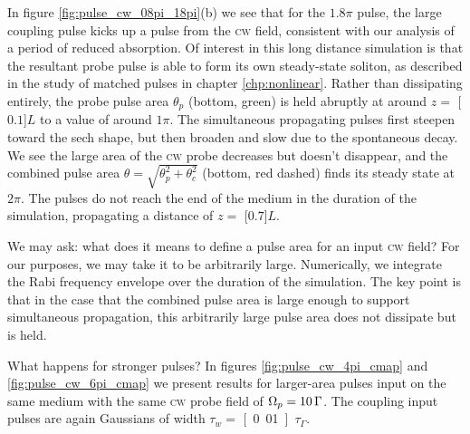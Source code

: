     In figure \ref{fig:pulse_cw_08pi_18pi}(b) we see that for the $1.8 \pi$
    pulse, the large coupling pulse kicks up a pulse from the \textsc{cw} field,
    consistent with our analysis of a period of reduced absorption. Of interest
    in this long distance simulation is that the resultant probe pulse is able
    to form its own steady-state soliton, as described in the study of matched
    pulses in chapter \ref{chp:nonlinear}. Rather than dissipating entirely, the
    probe pulse area $\theta_p$ (bottom, green) is held abruptly at around $z =
    $ \unit[$0.1$]{$L$} to a value of around $1 \pi$. The simultaneous
    propagating pulses first steepen toward the sech shape, but then broaden and
    slow due to the spontaneous decay. We see the large area of the \textsc{cw}
    probe decreases but doesn't disappear, and the combined pulse area $\theta =
    \sqrt{\theta_p^2 + \theta_c^2}$ (bottom, red dashed) finds its steady state
    at $2 \pi$. The pulses do not reach the end of the medium in the duration of
    the simulation, propagating a distance of $z = $ \unit[$0.7$]{$L$}.

    We may ask: what does it means to define a pulse area for an input
    \textsc{cw} field? For our purposes, we may take it to be arbitrarily large.
    Numerically, we integrate the Rabi frequency envelope over the duration of
    the simulation. The key point is that in the case that the combined pulse
    area is large enough to support simultaneous propagation, this arbitrarily
    large pulse area does not dissipate but is held.

    What happens for stronger pulses? In figures \ref{fig:pulse_cw_4pi_cmap} and
    \ref{fig:pulse_cw_6pi_cmap} we present results for larger-area pulses input
    on the same medium with the same \textsc{cw} probe field of $\Omega_p =
    \unit[10]{\Gamma}$. The coupling input pulses are again Gaussians of width
    $\tau_w = $ \unit[0.01]{$\tau_\Gamma$}.

